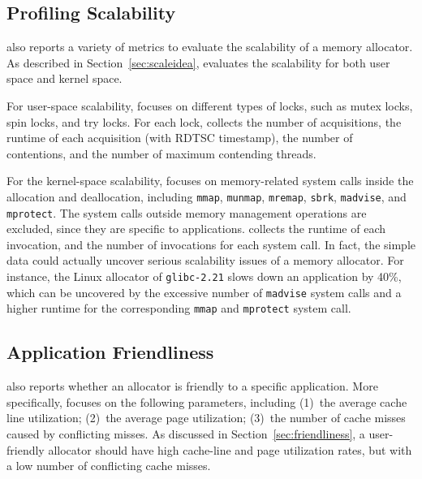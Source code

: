 \subsection{Profiling Scalability}
\MP{} also reports a variety of metrics to  evaluate the scalability of a memory allocator. As described in Section~\ref{sec:scaleidea}, \MP{} evaluates the scalability for both user space and kernel space. 

For user-space scalability, \MP{} focuses on different types of locks, such as mutex locks, spin locks, and try locks. For each lock, \MP{} collects the number of acquisitions, the runtime of each acquisition (with RDTSC timestamp), the number of contentions, and the number of maximum contending threads.  

For the kernel-space scalability, \MP{} focuses on memory-related system calls inside the allocation and deallocation, including \texttt{mmap}, \texttt{munmap}, \texttt{mremap}, \texttt{sbrk}, \texttt{madvise}, and \texttt{mprotect}. The system calls outside memory management operations are excluded, since they are specific to applications. \MP{} collects the runtime of each invocation, and the number of invocations for each system call. In fact, the simple data could actually uncover  serious scalability issues of a memory allocator. For instance, the Linux allocator of \texttt{glibc-2.21} slows down an application by 40\%, which can be uncovered by the excessive number of \texttt{madvise} system calls and a higher runtime for the corresponding \texttt{mmap} and \texttt{mprotect} system call.   



\subsection{Application Friendliness}
\label{sec:profilefriendliness}

\MP{} also reports whether an allocator is friendly to a specific application. More specifically, \MP{} focuses on the following parameters, including (1)~the average cache line utilization; (2)~the average page utilization; (3)~the number of cache misses caused by conflicting misses. As discussed in Section~\ref{sec:friendliness}, a user-friendly allocator should have  high cache-line and page utilization rates, but with a low number of conflicting cache misses.  


